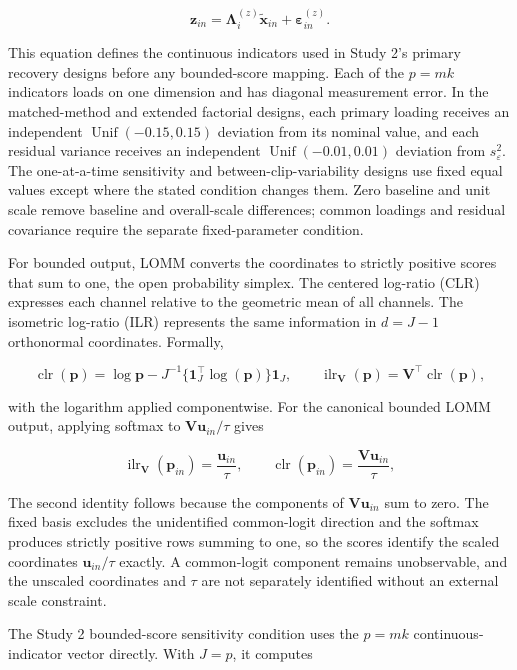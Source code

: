 \documentclass[
]{article}
\begin{document}
\[
\mathbf z_{in}
=\boldsymbol\Lambda_i^{(z)}\tilde{\mathbf x}_{in}
+\boldsymbol\varepsilon_{in}^{(z)}.
\]

This equation defines the continuous indicators used in Study 2's
primary recovery designs before any bounded-score mapping. Each of the
\(p=mk\) indicators loads on one dimension and has diagonal measurement
error. In the matched-method and extended factorial designs, each
primary loading receives an independent
\(\operatorname{Unif}(-0.15,0.15)\) deviation from its nominal value,
and each residual variance receives an independent
\(\operatorname{Unif}(-0.01,0.01)\) deviation from \(s_\varepsilon^2\).
The one-at-a-time sensitivity and between-clip-variability designs use
fixed equal values except where the stated condition changes them. Zero
baseline and unit scale remove baseline and overall-scale differences;
common loadings and residual covariance require the separate
fixed-parameter condition.

For bounded output, LOMM converts the coordinates to strictly positive
scores that sum to one, the open probability simplex. The centered
log-ratio (CLR) expresses each channel relative to the geometric mean of
all channels. The isometric log-ratio (ILR) represents the same
information in \(d=J-1\) orthonormal coordinates. Formally,

\[
\operatorname{clr}(\mathbf p)
=\log\mathbf p-
J^{-1}\{\mathbf 1_J^\top\log(\mathbf p)\}\mathbf 1_J,
\qquad
\operatorname{ilr}_{\mathbf V}(\mathbf p)
=\mathbf V^\top\operatorname{clr}(\mathbf p),
\]

with the logarithm applied componentwise. For the canonical bounded LOMM
output, applying softmax to \(\mathbf V\mathbf u_{in}/\tau\) gives

\[
\operatorname{ilr}_{\mathbf V}(\mathbf p_{in})=\frac{\mathbf u_{in}}{\tau},
\qquad
\operatorname{clr}(\mathbf p_{in})
=\frac{\mathbf V\mathbf u_{in}}{\tau},
\]

The second identity follows because the components of
\(\mathbf V\mathbf u_{in}\) sum to zero. The fixed basis excludes the
unidentified common-logit direction and the softmax produces strictly
positive rows summing to one, so the scores identify the scaled
coordinates \(\mathbf u_{in}/\tau\) exactly. A common-logit component
remains unobservable, and the unscaled coordinates and \(\tau\) are not
separately identified without an external scale constraint.

The Study 2 bounded-score sensitivity condition uses the \(p=mk\)
continuous-indicator vector directly. With \(J=p\), it computes
\end{document}
